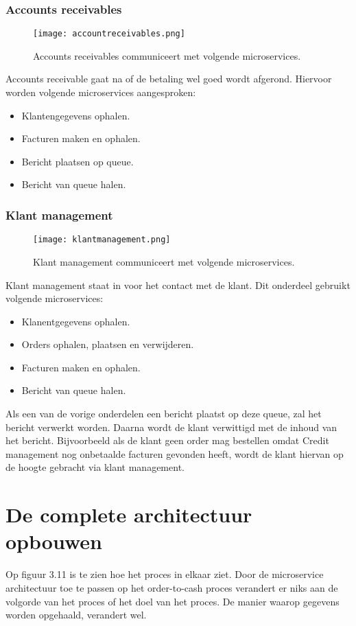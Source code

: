 \subsubsection{Accounts receivables}
\begin{figure}[h!]
	\texttt{[image: accountreceivables.png]}
	\caption{Accounts receivables communiceert met volgende microservices.}
	\centering
\end{figure}
Accounts receivable gaat na of de betaling wel goed wordt afgerond. Hiervoor worden volgende microservices aangesproken:
\begin{itemize}
	\item Klantengegevens ophalen.
	\item Facturen maken en ophalen.
	\item Bericht plaatsen op queue.
	\item Bericht van queue halen.
\end{itemize}

\subsubsection{Klant management}
\begin{figure}[h!]
	\texttt{[image: klantmanagement.png]}
	\caption{Klant management communiceert met volgende microservices.}
	\centering
\end{figure}
Klant management staat in voor het contact met de klant. Dit onderdeel gebruikt volgende microservices:
\begin{itemize}
	\item Klanentgegevens ophalen.
	\item Orders ophalen, plaatsen en verwijderen.
	\item Facturen maken en ophalen.
	\item Bericht van queue halen.
\end{itemize}
Als een van de vorige onderdelen een bericht plaatst op deze queue, zal het bericht verwerkt worden. Daarna wordt de klant verwittigd met de inhoud van het bericht. Bijvoorbeeld als de klant geen order mag bestellen omdat Credit management nog onbetaalde facturen gevonden heeft, wordt de klant hiervan op de hoogte gebracht via klant management.


\section{De complete architectuur opbouwen}
Op figuur 3.11 is te zien hoe het proces in elkaar ziet. Door de microservice architectuur toe te passen op het order-to-cash proces verandert er niks aan de volgorde van het proces of het doel van het proces. De manier waarop gegevens worden opgehaald, verandert wel. 


